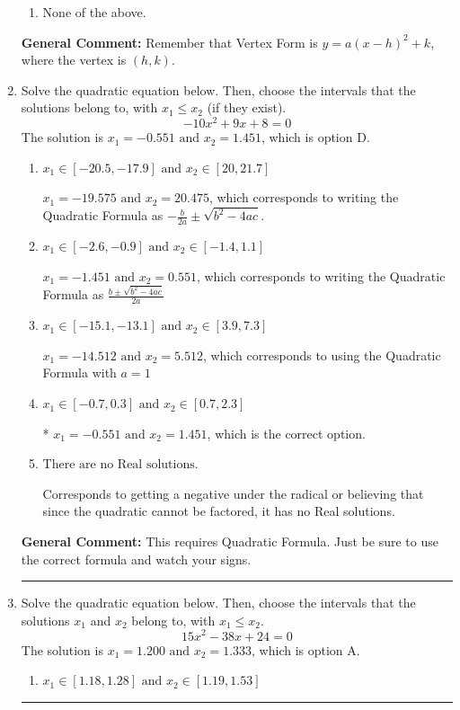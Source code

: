 \documentclass{extbook}[14pt]
\newcommand{\litem}[1]{\item #1

\rule{\textwidth}{0.4pt}}
\begin{document}
\begin{enumerate}
{\begin{enumerate}[label=\Alph*.]
\item None of the above.\end{enumerate}
\textbf{General Comment:} Remember that Vertex Form is $y = a(x-h)^2+k$, where the vertex is $(h, k)$.
}
\litem{
Solve the quadratic equation below. Then, choose the intervals that the solutions belong to, with $x_1 \leq x_2$ (if they exist).
\[ -10x^{2} +9 x + 8 = 0 \]The solution is \( x_1 = -0.551 \text{ and } x_2 = 1.451 \), which is option D.\begin{enumerate}[label=\Alph*.]
\item \( x_1 \in [-20.5, -17.9] \text{ and } x_2 \in [20, 21.7] \)

 $x_1 = -19.575 \text{ and } x_2 = 20.475$, which corresponds to writing the Quadratic Formula as $-\frac{b}{2a} \pm \sqrt{b^2 - 4ac}$.
\item \( x_1 \in [-2.6, -0.9] \text{ and } x_2 \in [-1.4, 1.1] \)

 $x_1 = -1.451 \text{ and } x_2 = 0.551$, which corresponds to writing the Quadratic Formula as $\frac{b \pm \sqrt{b^2 - 4ac}}{2a}$
\item \( x_1 \in [-15.1, -13.1] \text{ and } x_2 \in [3.9, 7.3] \)

 $x_1 = -14.512 \text{ and } x_2 = 5.512$, which corresponds to using the Quadratic Formula with $a=1$
\item \( x_1 \in [-0.7, 0.3] \text{ and } x_2 \in [0.7, 2.3] \)

* $x_1 = -0.551 \text{ and } x_2 = 1.451$, which is the correct option.
\item \( \text{There are no Real solutions.} \)

Corresponds to getting a negative under the radical or believing that since the quadratic cannot be factored, it has no Real solutions.
\end{enumerate}

\textbf{General Comment:} This requires Quadratic Formula. Just be sure to use the correct formula and watch your signs.
}
\litem{
Solve the quadratic equation below. Then, choose the intervals that the solutions $x_1$ and $x_2$ belong to, with $x_1 \leq x_2$.
\[ 15x^{2} -38 x + 24 = 0 \]The solution is \( x_1 = 1.200 \text{ and } x_2 = 1.333 \), which is option A.\begin{enumerate}[label=\Alph*.]
\item \( x_1 \in [1.18, 1.28] \text{ and } x_2 \in [1.19, 1.53] \)


\end{enumerate}}
\end{enumerate}
\end{document}

